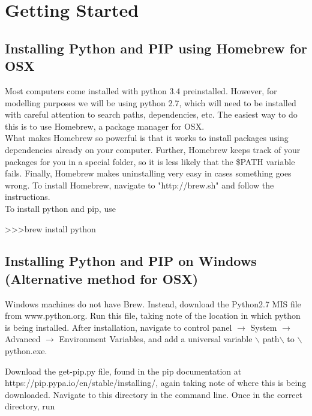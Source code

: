 \chapter{Getting Started}

\section{Installing Python and PIP using Homebrew for OSX}

Most computers come installed with python 3.4 preinstalled. However, for modelling purposes we will be using python 2.7, which will need to be installed with careful attention to search paths, dependencies, etc. The easiest way to do this is to use Homebrew, a package manager for OSX.\\

What makes Homebrew so powerful is that it works to install packages using dependencies already on your computer. Further, Homebrew keeps track of your packages for you in a special folder, so it is less likely that the \$PATH variable fails. Finally, Homebrew makes uninstalling very easy in cases something goes wrong. To install Homebrew, navigate to "http://brew.sh" and follow the instructions.\\

To install python and pip, use \\

\begin{mdframed}
\textgreater \textgreater\textgreater \quad brew install python
\end{mdframed}

\section{Installing Python and PIP on Windows (Alternative method for OSX)}

Windows machines do not have Brew. Instead, download the Python2.7 MIS file from www.python.org. Run this file, taking note of the location in which python is being installed. After installation, navigate to control panel $\rightarrow$ System $\rightarrow$ Advanced $\rightarrow$ Environment Variables, and add a universal variable $\backslash$ path$\backslash$ to $\backslash$ python.exe.

Download the get-pip.py file, found in the pip documentation at \\ https://pip.pypa.io/en/stable/installing/, again taking note of where this is being downloaded. Navigate to this directory in the command line. Once in the correct directory, run \\

